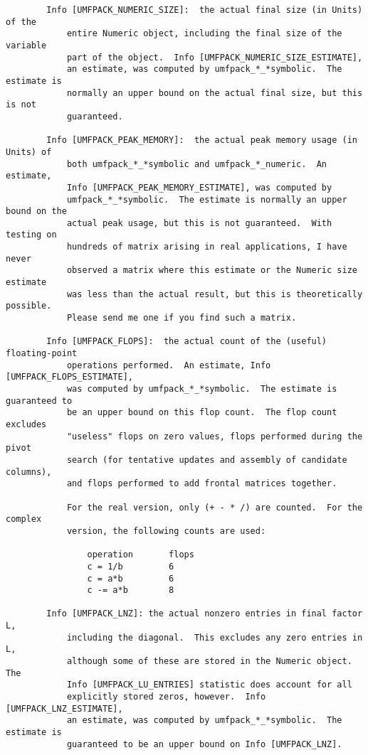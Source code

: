 \documentclass[11pt]{article}
\begin{document}
{\begin{verbatim}
        Info [UMFPACK_NUMERIC_SIZE]:  the actual final size (in Units) of the
            entire Numeric object, including the final size of the variable
            part of the object.  Info [UMFPACK_NUMERIC_SIZE_ESTIMATE],
            an estimate, was computed by umfpack_*_*symbolic.  The estimate is
            normally an upper bound on the actual final size, but this is not
            guaranteed.

        Info [UMFPACK_PEAK_MEMORY]:  the actual peak memory usage (in Units) of
            both umfpack_*_*symbolic and umfpack_*_numeric.  An estimate,
            Info [UMFPACK_PEAK_MEMORY_ESTIMATE], was computed by
            umfpack_*_*symbolic.  The estimate is normally an upper bound on the
            actual peak usage, but this is not guaranteed.  With testing on
            hundreds of matrix arising in real applications, I have never
            observed a matrix where this estimate or the Numeric size estimate
            was less than the actual result, but this is theoretically possible.
            Please send me one if you find such a matrix.

        Info [UMFPACK_FLOPS]:  the actual count of the (useful) floating-point
            operations performed.  An estimate, Info [UMFPACK_FLOPS_ESTIMATE],
            was computed by umfpack_*_*symbolic.  The estimate is guaranteed to
            be an upper bound on this flop count.  The flop count excludes
            "useless" flops on zero values, flops performed during the pivot
            search (for tentative updates and assembly of candidate columns),
            and flops performed to add frontal matrices together.

            For the real version, only (+ - * /) are counted.  For the complex
            version, the following counts are used:

                operation       flops
                c = 1/b         6
                c = a*b         6
                c -= a*b        8

        Info [UMFPACK_LNZ]: the actual nonzero entries in final factor L,
            including the diagonal.  This excludes any zero entries in L,
            although some of these are stored in the Numeric object.  The
            Info [UMFPACK_LU_ENTRIES] statistic does account for all
            explicitly stored zeros, however.  Info [UMFPACK_LNZ_ESTIMATE],
            an estimate, was computed by umfpack_*_*symbolic.  The estimate is
            guaranteed to be an upper bound on Info [UMFPACK_LNZ].


\end{verbatim}}
\end{document}
